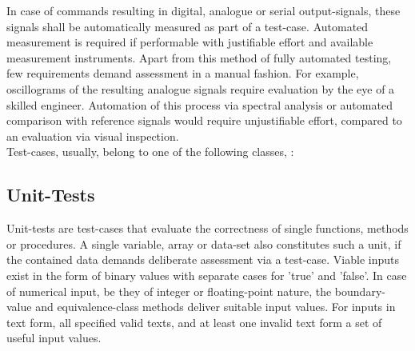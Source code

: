 \documentclass[master,english,smartquotes,apa]{hgbthesis}
\begin{document}
			
			In case of commands resulting in digital, analogue or serial output-signals, these signals shall be automatically measured as part of a test-case. Automated measurement is required if performable with justifiable effort and available measurement instruments. Apart from this method of fully automated testing, few requirements demand assessment in a manual fashion. For example, oscillograms of the resulting analogue signals require evaluation by the eye of a skilled engineer. Automation of this process via spectral analysis or automated comparison with reference signals would require unjustifiable effort, compared to an evaluation via visual inspection. \\
			Test-cases, usually, belong to one of the following classes, :
			\subsection{Unit-Tests}
			Unit-tests are test-cases that evaluate the correctness of single functions, methods or procedures. A single variable, array or data-set also constitutes such a unit, if the contained data demands deliberate assessment via a test-case. Viable inputs exist in the form of binary values with separate cases for 'true' and 'false'. In case of numerical input, be they of integer or floating-point nature, the boundary-value and equivalence-class methods deliver suitable input values. For inputs in text form, all specified valid texts, and at least one invalid text form a set of useful input values. \cite{jorgensen13}
\end{document}
